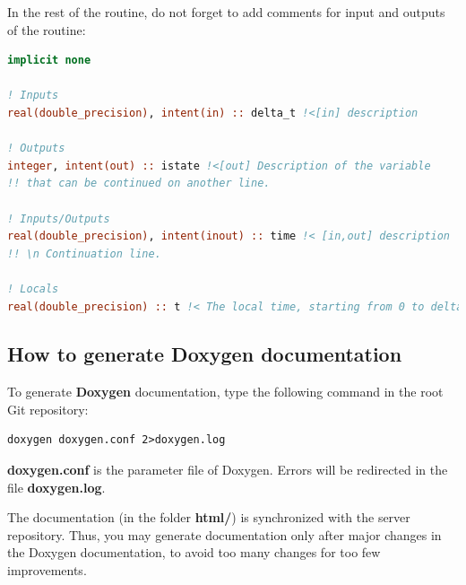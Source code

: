 \documentclass[english,a4paper,twoside]{article}
\begin{document}
In the rest of the routine, do not forget to add comments for input and outputs of the routine: 
\begin{lstlisting}[language=Fortran]
implicit none

! Inputs
real(double_precision), intent(in) :: delta_t !<[in] description

! Outputs
integer, intent(out) :: istate !<[out] Description of the variable
!! that can be continued on another line.

! Inputs/Outputs
real(double_precision), intent(inout) :: time !< [in,out] description
!! \n Continuation line. 

! Locals
real(double_precision) :: t !< The local time, starting from 0 to delta_t
\end{lstlisting}

\subsection{How to generate Doxygen documentation}
To generate \textbf{Doxygen} documentation, type the following command in the root Git repository:
\begin{verbatim}
doxygen doxygen.conf 2>doxygen.log
\end{verbatim}

\textbf{doxygen.conf} is the parameter file of Doxygen. Errors will be redirected in the file \textbf{doxygen.log}.

\begin{attention}
The documentation (in the folder \textbf{html/}) is synchronized with the server repository. Thus, you may generate documentation only after major changes in the Doxygen documentation, to avoid too many changes for too few improvements.
\end{attention}



\printindex
\end{document}
